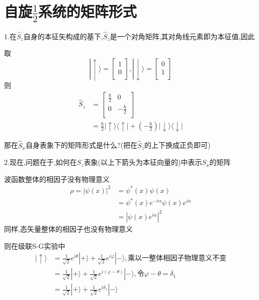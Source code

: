\documentclass[lang=cn,10pt]{elegantbook}
\begin{document}
 \section{自旋\texorpdfstring{$\frac{1}{2}$}{1/2}系统的矩阵形式}
 
 1.在$\hat{S}_z$自身的本征矢构成的基下,$\hat{S}_z$是一个对角矩阵,其对角线元素即为本征值,因此

 取\begin{equation*}
 	|\uparrow \rangle =\left[ \begin{array}{c}
 		1\\
 		0\\
 	\end{array} \right] ,|\downarrow \rangle =\left[ \begin{array}{c}
 		0\\
 		1\\
 	\end{array} \right] 
 \end{equation*}
 则\begin{equation*}
 	\begin{split}
 		\hat{S}_z&=\left[ \begin{matrix}
 			\frac{\hbar}{2}&		0\\
 			0&		-\frac{\hbar}{2}\\
 		\end{matrix} \right] 
 		\\
 		&=\frac{\hbar}{2}|\uparrow \rangle \langle \uparrow |+\left( -\frac{\hbar}{2} \right) |\downarrow \rangle \langle \downarrow |
 	\end{split}
 \end{equation*}
 
 那在$\hat{S}_x$自身表象下的矩阵形式是什么?(把在$\hat{S}_z$的上下换成正负即可)
 
 2.现在,问题在于,如何在$S_z $表象(以上下箭头为本征向量的)中表示$S_x $的矩阵
 
 波函数整体的相因子没有物理意义
 \begin{equation*}
 	\begin{split}
 		\rho =|\psi \left( x \right) |^2&=\psi ^*\left( x \right) \psi \left( x \right) 
 		\\
 		&=\psi ^*\left( x \right) e^{-i\alpha}\psi \left( x \right) e^{i\alpha}
 		\\
 		&=|\psi \left( x \right) e^{i\alpha}|^2
 	\end{split}
 \end{equation*}
 同样,态矢量整体的相因子也没有物理意义
 
 则在级联S-G实验中
 \begin{equation*}
 	\begin{split}
 		|\uparrow \rangle &=\frac{1}{\sqrt{2}}e^{i\theta}|+\rangle +\frac{1}{\sqrt{2}}e^{i\varphi}|-\rangle ,\text{乘以一整体相因子物理意义不变}
 		\\
 		&=\frac{1}{\sqrt{2}}|+\rangle +\frac{1}{\sqrt{2}}e^{i\left( \varphi -\theta \right)}|-\rangle ,\text{令}\varphi -\theta =\delta _1
 		\\
 		&=\frac{1}{\sqrt{2}}|+\rangle +\frac{1}{\sqrt{2}}e^{i\delta _1}|-\rangle 
 	\end{split}
 \end{equation*}
 
\end{document}
